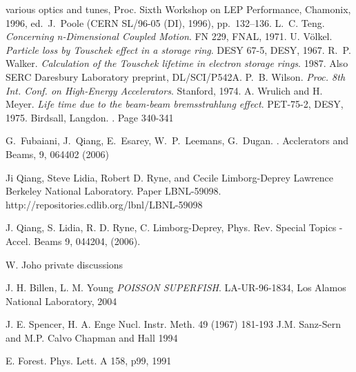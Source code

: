 \begin{thebibliography}{10}
{    various optics and tunes}, Proc. Sixth Workshop on LEP
  Performance, Chamonix, 1996, ed.~J.~Poole (CERN SL/96-05 (DI),
  1996), pp.~132--136.
L.~C. Teng.
{\sl Concerning n-Dimensional Coupled Motion}.
FN 229, FNAL, 1971.
U. V\"olkel.
{\sl Particle loss by Touschek effect in a storage ring}.
DESY 67-5, DESY, 1967.
R.~P. Walker.
{\sl Calculation of the Touschek lifetime in electron storage rings}.
1987.
Also SERC Daresbury Laboratory preprint, DL/SCI/P542A.
P.~B. Wilson.
{\sl Proc. 8th Int. Conf. on High-Energy Accelerators}.
Stanford, 1974.
A. Wrulich and H. Meyer.
{\sl Life time due to the beam-beam bremsstrahlung effect}.
PET-75-2, DESY, 1975.
%
  Birdsall, Langdon.
  .
  \newblock Page 340-341

  G.\ Fubaiani, J.\ Qiang, E.\ Esarey, W.\ P.\ Leemans, G.\ Dugan.
  .
  \newblock Acclerators and Beams, 9, 064402 (2006) 
 
 Ji Qiang, Steve Lidia, Robert D. Ryne, and Cecile Limborg-Deprey
    \newblock Lawrence Berkeley National Laboratory. Paper LBNL-59098. http://repositories.cdlib.org/lbnl/LBNL-59098
 
 J. Qiang, S. Lidia, R. D. Ryne, C. Limborg-Deprey, 
  \newblock Phys. Rev. Special Topics - Accel. Beams 9, 044204, (2006).
 
 W. Joho
  \newblock private discussions
 
J. H. Billen, L. M. Young
{\sl POISSON SUPERFISH}.
LA-UR-96-1834, Los Alamos National Laboratory, 2004

J. E. Spencer,  H. A. Enge
\newblock Nucl. Instr. Meth. 49 (1967) 181-193
J.M. Sanz-Sern and M.P. Calvo
Chapman and Hall 1994

 E. Forest. Phys. Lett. A 158, p99, 1991


\end{thebibliography}

